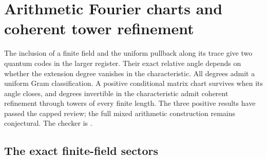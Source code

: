 \section{Arithmetic Fourier charts and coherent tower refinement}
\label{sec:arithmetic-fourier-charts}

The inclusion of a finite field and the uniform pullback along its trace
give two quantum codes in the larger register. Their exact relative angle
depends on whether the extension degree vanishes in the characteristic.
All degrees admit a uniform Gram classification. A positive conditional
matrix chart survives when its angle closes, and degrees invertible in the
characteristic admit coherent refinement through towers of every finite
length. The three positive results have passed the capped review; the full
mixed arithmetic construction remains conjectural.
The checker is .

\subsection{The exact finite-field sectors}

